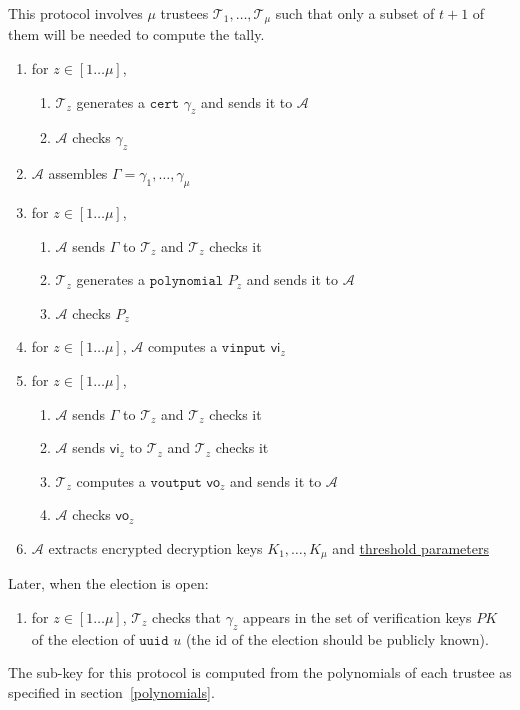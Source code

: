 \documentclass[a4paper]{article}
\newcommand{\uuid}{\texttt{uuid}}
\newcommand{\cert}{\texttt{cert}}
\newcommand{\poly}{\texttt{polynomial}}
\newcommand{\vinput}{\texttt{vinput}}
\newcommand{\voutput}{\texttt{voutput}}
\begin{document}
This protocol involves $\mu$ trustees
$\mathcal{T}_1,\dots,\mathcal{T}_\mu$ such that only a subset of
$t+1$ of them will be needed to compute the tally.
\begin{enumerate}
\item for $z\in[1\dots \mu]$,
  \begin{enumerate}
  \item $\mathcal{T}_z$ generates a \hyperref[certificates]{$\cert$} $\gamma_z$
    and sends it to $\mathcal{A}$
  \item $\mathcal{A}$ checks $\gamma_z$
  \end{enumerate}
\item $\mathcal{A}$ assembles $\Gamma=\gamma_1,\dotsc,\gamma_\mu$
\item for $z\in[1\dots \mu]$,
  \begin{enumerate}
  \item $\mathcal{A}$ sends $\Gamma$ to $\mathcal{T}_z$ and $\mathcal{T}_z$ checks it
  \item $\mathcal{T}_z$ generates a \hyperref[polynomials]{$\poly$} $P_z$ and
    sends it to $\mathcal{A}$
  \item $\mathcal{A}$ checks $P_z$
  \end{enumerate}
\item for $z\in[1\dots \mu]$, $\mathcal{A}$ computes a
  \hyperref[vinputs]{$\vinput$} $\textsf{vi}_z$
\item for $z\in[1\dots \mu]$,
  \begin{enumerate}
  \item $\mathcal{A}$ sends $\Gamma$ to $\mathcal{T}_z$ and $\mathcal{T}_z$ checks it
  \item $\mathcal{A}$ sends $\textsf{vi}_z$ to $\mathcal{T}_z$ and $\mathcal{T}_z$ checks it
  \item $\mathcal{T}_z$ computes a \hyperref[voutputs]{$\voutput$} $\textsf{vo}_z$ and
    sends it to $\mathcal{A}$
  \item $\mathcal{A}$ checks $\textsf{vo}_z$
  \end{enumerate}
\item $\mathcal{A}$ extracts encrypted decryption keys $K_1,\dots,K_\mu$ and
  \hyperref[threshold-params]{threshold parameters}
\end{enumerate}
Later, when the election is open:
\begin{enumerate}
\item for $z\in[1\dots \mu]$, $\mathcal{T}_z$ checks that $\gamma_z$
  appears in the set of verification keys $PK$ of the election of {$\uuid$}
  $u$ (the id of the election should be publicly known).
\end{enumerate}
The sub-key for this protocol is computed from the polynomials of each
trustee as specified in section~\ref{polynomials}.
\end{document}
